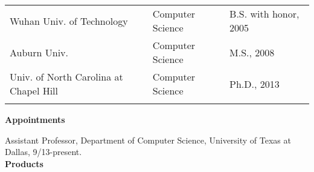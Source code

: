 \documentclass[10pt,letterpaper]{article}
\begin{document}
	\begin{tabular}{l l l}
		Wuhan Univ. of Technology &  Computer Science & B.S. with honor, 2005 \\
		Auburn Univ. & Computer Science & M.S., 2008 \\
		Univ. of North Carolina at Chapel Hill & Computer Science & Ph.D., 2013\\ \\
	\end{tabular}

\noindent \textbf{Appointments}\

	\hspace{1mm} Assistant Professor, Department of Computer Science, University of Texas at Dallas, 9/13-present. \\
	
\noindent \textbf{Products} 
\end{document}
